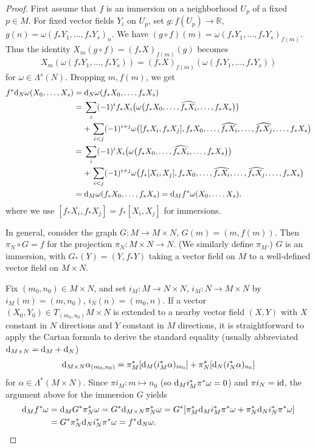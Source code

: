 \documentclass[pdftex]{sigma}
\numberwithin{equation}{section}
\theoremstyle{definition}
\newcommand{\BbR}{{\mathbb R}}
\newcommand{\R}{\BbR}
\begin{document}
 \begin{proof} First assume that $f$ is an immersion on a neighborhood $U_p$ of a fixed $p\in M$.
For fixed vector fields $Y_i$ on $U_p$, set
 $g\colon f(U_p)\to \R$, $g(n) = \omega(f_*Y_1,\dots, f_*Y_s)_{n}$.
We have $(g\circ f)(m) = \omega(f_*Y_1,\dots, f_*Y_s)_{f(m)}$. Thus the identity $X_m(g\circ f) = (f_*X)
_{f(m)}(g)$
becomes
\[X_m(\omega(f_*Y_1,\dots, f_*Y_s)) = (f_*X)_{f(m)}(\omega(f_*Y_1,\dots, f_*Y_s))\]
for $\omega \in \Lambda^s(N)$.
Dropping $m, f(m)$, we get
\begin{align*}f^* {\rm d}_N\omega(X_0,\dots, X_{s})={}& {\rm d}_N\omega(f_*X_0,\dots, f_*X_{s})\\
={}&\sum_i (-1)^i f_*X_i \bigl( \omega\bigl(f_*X_0,\dots,\widehat{f_*X_i},\dots, f_*X_{s}\bigr)\bigr)\\
&
{+}\, \sum_{i<j} (-1)^{i+j}\omega\bigl([f_*X_i,f_*X_j], f_*X_0,\dots, \widehat{f_*X_i},\dots, \widehat{f_*X_j},\dots,f_*X_{s}\bigr)\\
={}& \sum_i (-1)^i X_i \bigl( \omega\bigl(f_*X_0,\dots,\widehat{f_*X_i},\dots, f_*X_{s}\bigr)\bigr)\\
&
{+}\, \sum_{i<j} (-1)^{i+j}\omega\bigl(f_*[X_i,X_j], f_*X_0,\dots, \widehat{f_*X_i},\dots, \widehat{f_*X_j},\dots,f_*X_{s}\bigr)\\
={}& {\rm d}_M \omega (f_*X_0,\dots, f_*X_s) = {\rm d}_Mf^*\omega(X_0,\dots,X_s),
\end{align*}
where we use $[f_*X_i,f_*X_j] = f_*[X_i,X_j]$ for immersions.

In general,
consider the graph $G\colon M\to M\times N$, $G(m) = (m, f(m))$. Then $\pi_N\circ G = f$ for the projection $\pi_N\colon M\times N\to N$. (We similarly define $\pi_M$.)
$G$ is an immersion, with $G_*(Y) = (Y, f_*Y)$ taking a vector field on $M$ to a well-defined vector field on $M\times N$.

Fix $(m_0, n_0)\in M\times N$, and set $i_M\colon M\to N\times N$, $i_M\colon N\to M\times N$ by
$i_M(m) = (m, n_0)$, $i_N(n) = (m_0,n)$. If a vector $(X_0,Y_0)\in T_{(m_0,n_0)}M\times N$
is extended to a nearby vector field $(X,Y)$ with $X$ constant in $N$ directions and $Y$ constant in $M$ directions,
it is straightforward to apply the Cartan formula to derive the standard equality (usually abbreviated
$ {\rm d}_{M\times N} = {\rm d}_M + {\rm d}_N$)
\[ {\rm d}_{M\times N}\alpha_{(m_0,n_0)} = \pi_M^*[ {\rm d}_M (i_M^*\alpha)_{m_0}] + \pi_N^*[ {\rm d}_N (i_N^*\alpha)_{n_0}] \]
for $\alpha\in \Lambda^*(M\times N)$.
Since $\pi i_M\colon m\mapsto n_0$ (so ${\rm d}_Mi_M^*\pi^*\omega = 0$) and $\pi i_N = {\rm id}$, the argument above for the immersion $G$ yields
\begin{align*} {\rm d}_Mf^*\omega &= {\rm d}_M G^*\pi_N^*\omega = G^* {\rm d}_{M\times N}\pi_N^*\omega
= G^*[\pi_M^* {\rm d}_M i_M^*\pi^*\omega + \pi_N^* {\rm d}_N i_N^*\pi^*\omega] \\
&= G^*\pi_N^* {\rm d}_N i_N^*\pi^*\omega = f^* {\rm d}_N \omega.\tag*{\qed}
\end{align*}
\renewcommand{\qed}{}
\end{proof}
\end{document}
